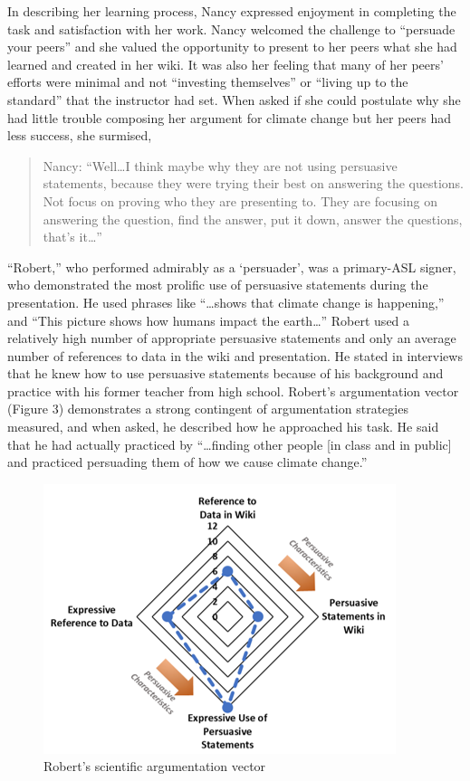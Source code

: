 \documentclass[11.5pt]{sig-alternate} %
\begin{document}
\begin{large}
In describing her learning process, Nancy expressed enjoyment in completing the task and satisfaction with her work. Nancy welcomed the challenge to “persuade your peers” and she valued the opportunity to present to her peers what she had learned and created in her wiki. It was also her feeling that many of her peers’ efforts were minimal and not “investing themselves” or “living up to the standard” that the instructor had set. When asked if she could postulate why she had little trouble composing her argument for climate change but her peers had less success, she surmised, 
\begin{quote}
    Nancy:  “Well…I think maybe why they are not using persuasive statements, because they were trying their best on answering the questions. Not focus on proving who they are presenting to. They are focusing on answering the question, find the answer, put it down, answer the questions, that’s it…”
\end{quote}

“Robert,” who performed admirably as a ‘persuader’, was a primary-ASL signer, who demonstrated the most prolific use of persuasive statements during the presentation. He used phrases like “…shows that climate change is happening,” and “This picture shows how humans impact the earth…” Robert used a relatively high number of appropriate persuasive statements and only an average number of references to data in the wiki and presentation. He stated in interviews that he knew how to use persuasive statements because of his background and practice with his former teacher from high school. Robert’s argumentation vector (Figure 3) demonstrates a strong contingent of argumentation strategies measured, and when asked, he described how he approached his task. He said that he had actually practiced by “…finding other people [in class and in public] and practiced persuading them of how we cause climate change.” 

\begin{figure}[h]
    \centering
    \includegraphics[width=1\linewidth]{Fig 3.png}
    \caption{Robert’s scientific argumentation vector}
\end{figure}


\end{large}
\end{document}
